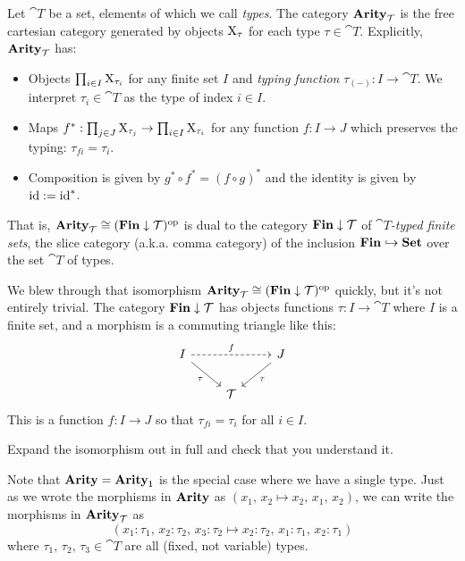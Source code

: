 \documentclass[DynamicalBook]{subfiles}
\begin{document}
\begin{definition}
  Let $\cat{T}$ be a set, elements of which we call \emph{types}. The category $\textbf{Arity}_{\mathcal{T}}$ is the
  free cartesian category generated by objects $\mathrm{X}_{\tau}$ for each type $\tau
  \in \cat{T}$. Explicitly, $\textbf{Arity}_{\mathcal{T}}$ has:
  \begin{itemize}
    \item Objects $\prod_{i \in I} \mathrm{X}_{\tau_i}$ for any finite set $I$ and
      \emph{typing function}
      $\tau_{(-)} : I \to \cat{T}$. We interpret $\tau_i \in \cat{T}$ as the
      type of index $i \in I$.
    \item Maps $f^{\ast} : \prod_{j \in J} \mathrm{X}_{\tau_j} \to
      \prod_{i \in I} \mathrm{X}_{\tau_i}$ for any function $f : I \to J$ which
      preserves the typing: $\tau_{fi} = \tau_i$.
    \item Composition is given by $g^{\ast} \circ f^{\ast} = (f \circ g)^{\ast}$
      and the identity is given by $\mathrm{id} := \mathrm{id}^{\ast}$. 
  \end{itemize}
  That is, $\textbf{Arity}_{\mathcal{T}} \cong (\textbf{Fin} \downarrow \mathcal{T})^{\textnormal{op}}$ is dual to
  the category
  $\textbf{Fin} \downarrow \mathcal{T}$ of \emph{$\cat{T}$-typed finite sets}, the slice category (a.k.a. comma category)
  of the inclusion $\textbf{Fin} \hookrightarrow \textbf{Set}$ over the set $\cat{T}$
  of types. 
\end{definition}

\begin{exercise}
  We blew through that isomorphism $\textbf{Arity}_{\mathcal{T}} \cong (\textbf{Fin} \downarrow
  \mathcal{T})^{\textnormal{op}}$ quickly, but it's not entirely trivial. The category $\textbf{Fin} \downarrow
  \mathcal{T}$ has objects functions $\tau : I \to \cat{T}$ where $I$ is a finite
  set, and a morphism is a commuting triangle like this:
  \[
    \begin{tikzcd}
      I \ar[rr, dashed, "f"] \ar[dr, "\tau"'] & & J \ar[dl, "\tau"] \\
      & \cat{T} &
    \end{tikzcd}
  \]
This is a function $f : I \to J$ so that $\tau_{fi} = \tau_{i}$ for all $i \in I$.

  Expand the isomorphism out in full and check
  that you understand it.
\end{exercise}

Note that $\textbf{Arity} = \textbf{Arity}_{\mathsf{1}}$ is the special case where we have a single
type. Just as we wrote the morphisms in $\textbf{Arity}$ as $(x_1,\, x_2 \mapsto x_2,\,
x_1,\, x_2)$, we can write the morphisms in $\textbf{Arity}_{\mathcal{T}}$ as
$$(x_1 : \tau_1,\, x_2 : \tau_2,\, x_3 : \tau_2 \mapsto x_2 : \tau_2,\, x_1 :
\tau_1,\, x_2 : \tau_1)$$
where $\tau_1,\, \tau_2,\, \tau_3 \in \cat{T}$ are all (fixed, not variable) types.
\end{document}
